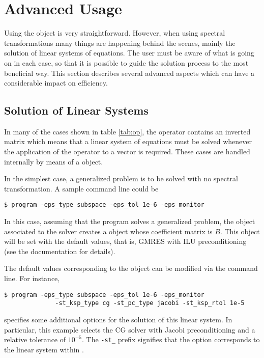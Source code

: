 \section{Advanced Usage}

Using the  object is very straightforward. However, when using spectral transformations many things are happening behind the scenes, mainly the solution of linear systems of equations. The user must be aware of what is going on in each case, so that it is possible to guide the solution process to the most beneficial way. This section describes several advanced aspects which can have a considerable impact on efficiency.

\subsection{Solution of Linear Systems}
\label{sec:lin}

	In many of the cases shown in table \ref{tab:op}, the operator contains an inverted matrix which means that a linear system of equations must be solved whenever the application of the operator to a vector is required. These cases are handled internally by means of a  object.

	In the simplest case, a generalized problem is to be solved with no spectral transformation. A sample command line could be
\begin{Verbatim}[fontsize=\small]
	$ program -eps_type subspace -eps_tol 1e-6 -eps_monitor
\end{Verbatim}
In this case, assuming that the program solves a generalized problem, the  object associated to the  solver creates a  object whose coefficient matrix is $B$. This  object will be set with the default values, that is, GMRES with ILU preconditioning (see the \petsc{} documentation for details).

	The default values corresponding to the  object can be modified via the command line. For instance,
\begin{Verbatim}[fontsize=\small]
	$ program -eps_type subspace -eps_tol 1e-6 -eps_monitor
	          -st_ksp_type cg -st_pc_type jacobi -st_ksp_rtol 1e-5
\end{Verbatim}
specifies some additional options for the solution of this linear system. In particular, this example selects the CG solver with Jacobi preconditioning and a relative tolerance of $10^{-5}$. The \Verb!-st_! prefix signifies that the option corresponds to the linear system within .

